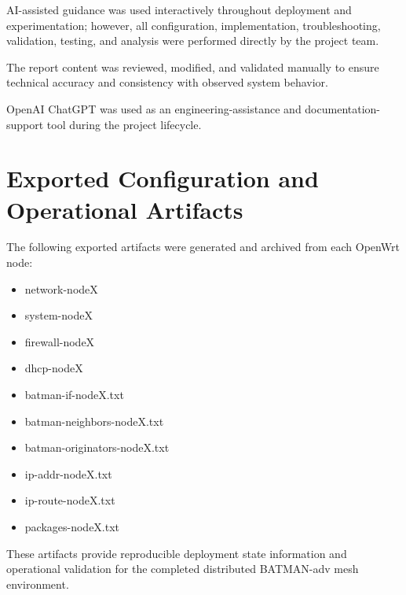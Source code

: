 \documentclass[conference]{IEEEtran}
\begin{document}
AI-assisted guidance was used interactively throughout deployment and experimentation; however, all configuration, implementation, troubleshooting, validation, testing, and analysis were performed directly by the project team.

The report content was reviewed, modified, and validated manually to ensure technical accuracy and consistency with observed system behavior.

OpenAI ChatGPT was used as an engineering-assistance and documentation-support tool during the project lifecycle.

\appendices

\section{Exported Configuration and Operational Artifacts}

The following exported artifacts were generated and archived from each OpenWrt node:

\begin{itemize}
    \item network-nodeX
    \item system-nodeX
    \item firewall-nodeX
    \item dhcp-nodeX
    \item batman-if-nodeX.txt
    \item batman-neighbors-nodeX.txt
    \item batman-originators-nodeX.txt
    \item ip-addr-nodeX.txt
    \item ip-route-nodeX.txt
    \item packages-nodeX.txt
\end{itemize}

These artifacts provide reproducible deployment state information and operational validation for the completed distributed BATMAN-adv mesh environment.
\end{document}
